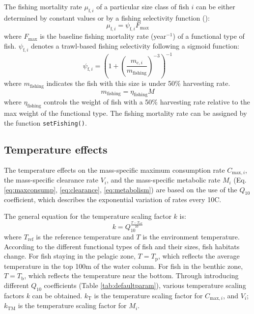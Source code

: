\documentclass[
]{article}
\begin{document}
The fishing mortality rate \(\mu_{\mathrm{f},i}\) of a particular size
class of fish \(i\) can be either determined by constant values or by a
fishing selectivity function (): \begin{equation}
\mu_{\mathrm{f},i}=\psi_{\mathrm{f},i}F_{\mathrm{max}}
\label{eq:fishing}
\end{equation} where \(F_{\mathrm{max}}\) is the baseline fishing
mortality rate (year\(^{-1}\)) of a functional type of fish.
\(\psi_{\mathrm{f},i}\) denotes a trawl-based fishing selectivity
following a sigmoid function: \begin{equation}
\psi_{\mathrm{f},i} = \left(1+\left(\frac{m_{\mathrm{c},i}}{m_{\mathrm{fishing}}}\right)^{-3} \right)^{-1}
\end{equation} where \(m_{\mathrm{fishing}}\) indicates the fish with
this size is under 50\% harvesting rate. \begin{equation}
m_{\mathrm{fishing}}=\eta_{\mathrm{fishing}} M
\end{equation} where \(\eta_{\mathrm{fishing}}\) controls the weight of
fish with a 50\% harvesting rate relative to the max weight of the
functional type. The fishing mortality rate can be assigned by the
function \texttt{setFishing()}.

\subsection{Temperature effects}\label{temperature-effects}

The temperature effects on the mass-specific maximum consumption rate
\(C_{\mathrm{max},i}\), the mass-specific clearance rate \(V_{i}\), and
the mass-specific metabolic rate \(M_i\) (Eq. \ref{eq:maxconsump},
\ref{eq:clearance}, \ref{eq:metabolism}) are based on the use of the
\(Q_{10}\) coefficient, which describes the exponential variation of
rates every 10\textdegree{}C.

The general equation for the temperature scaling factor \(k\) is:
\begin{equation}
k = Q_{10}^{\frac{T-T_{\mathrm{ref}}}{10}} \label{eq:Tscfac}
\end{equation} where \(T_{\mathrm{ref}}\) is the reference temperature
and \(T\) is the environment temperature. According to the different
functional types of fish and their sizes, fish habitats change. For fish
staying in the pelagic zone, \(T=T_{\mathrm{p}}\), which reflects the
average temperature in the top 100m of the water column. For fish in the
benthic zone, \(T=T_{\mathrm{b}}\), which reflects the temperature near
the bottom. Through introducing different \(Q_{10}\) coefficients (Table
\ref{tab:defaultparam}), various temperature scaling factors \(k\) can
be obtained. \(k_{\mathrm{T}}\) is the temperature scaling factor for
\(C_{\mathrm{max},i}\), and \(V_{i}\); \(k_{\mathrm{TM}}\) is the
temperature scaling factor for \(M_i\).
\end{document}
